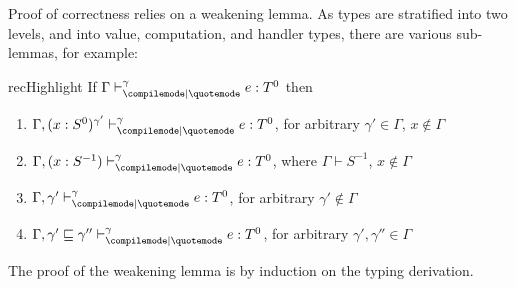 Proof of correctness relies on a weakening lemma. As types are stratified into two levels, and into value, computation, and handler types, there are various sub-lemmas, for example:

\newcommand{\rcqtypejudge}[4][\Gamma]{{#1} \vdash_{\compilemode \mid \quotemode}^{#2} {#3} : {#4}}
\newcommand{\rctypejudge}[4][\Gamma]{{#1} \vdash_{\compilemode}^{#2} {#3} : {#4}}
\newcommand{\rqtypejudge}[4][\Gamma]{{#1} \vdash_{\quotemode}^{#2} {#3}: {#4}}
\newcommand{\rstypejudge}[3][\Gamma]{{#1} \vdash_{\splicemode} {#2} : {#3}}

\begin{lemma}{recHighlight}
  If $\rcqtypejudge{\gamma}{e}{T^0}$ then
  \begin{enumerate}
    \item $\rcqtypejudge[\Gamma, (x:S^0)^{\gamma'}]{\gamma}{e}{T^0}$, for arbitrary $\gamma' \in \Gamma$, $x \notin \Gamma$
    \item $\rcqtypejudge[\Gamma, (x:S^{-1})]{\gamma}{e}{T^0}$, where $\Gamma \vdash S^{-1}$, $x \notin \Gamma$
    \item $\rcqtypejudge[\Gamma, \gamma']{\gamma}{e}{T^0}$, for arbitrary $\gamma' \notin \Gamma$
    \item $\rcqtypejudge[\Gamma, \gamma' \sqsubseteq \gamma'']{\gamma}{e}{T^0}$, for arbitrary $\gamma', \gamma'' \in \Gamma$
  \end{enumerate}
\end{lemma}
The proof of the weakening lemma is by induction on the typing derivation.

